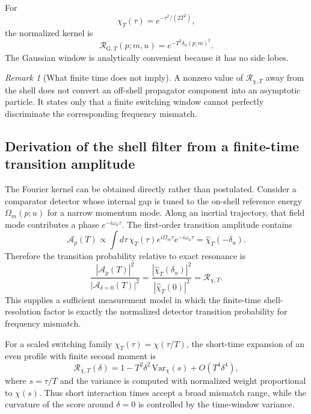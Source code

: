 \documentclass[11pt]{article}
\theoremstyle{remark}
\newtheorem{remark}{Remark}
\newcommand{\ShellRes}{\mathcal R}
\begin{document}
For
\begin{equation}
  \chi_T(\tau)=e^{-\tau^2/(2T^2)},
\end{equation}
the normalized kernel is
\begin{equation}
  \ShellRes_{\mathrm{G},T}(p;m,u)
  =e^{-T^2\delta_u(p;m)^2}.
  \label{eq:gaussian-kernel}
\end{equation}
The Gaussian window is analytically convenient because it has no side lobes.

\begin{remark}[What finite time does not imply]
A nonzero value of $\ShellRes_{\chi,T}$ away from the shell does not convert an off-shell propagator component into an asymptotic particle. It states only that a finite switching window cannot perfectly discriminate the corresponding frequency mismatch.
\end{remark}


\subsection{Derivation of the shell filter from a finite-time transition amplitude}
The Fourier kernel can be obtained directly rather than postulated. Consider a comparator detector whose internal gap is tuned to the on-shell reference energy $\Omega_m(p;u)$ for a narrow momentum mode. Along an inertial trajectory, that field mode contributes a phase $e^{-i\omega_u\tau}$. The first-order transition amplitude contains
\begin{equation}
 \mathcal A_p(T)
 \propto\int d\tau\,\chi_T(\tau)
 e^{i\Omega_m\tau}e^{-i\omega_u\tau}
 =\widehat\chi_T(-\delta_u).
 \label{eq:shell-amplitude-derivation}
\end{equation}
Therefore the transition probability relative to exact resonance is
\begin{equation}
 \frac{|\mathcal A_p(T)|^2}{|\mathcal A_{\delta=0}(T)|^2}
 =\frac{|\widehat\chi_T(\delta_u)|^2}{|\widehat\chi_T(0)|^2}
 =\ShellRes_{\chi,T}.
 \label{eq:shell-kernel-derived}
\end{equation}
This supplies a sufficient measurement model in which the finite-time shell-resolution factor is exactly the normalized detector transition probability for frequency mismatch.

For a scaled switching family $\chi_T(\tau)=\chi(\tau/T)$, the short-time expansion of an even profile with finite second moment is
\begin{equation}
 \ShellRes_{\chi,T}(\delta)
 =1-T^2\delta^2\,\mathrm{Var}_{\chi}(s)+O(T^4\delta^4),
 \label{eq:shell-short-time-filter}
\end{equation}
where $s=\tau/T$ and the variance is computed with normalized weight proportional to $\chi(s)$. Thus short interaction times accept a broad mismatch range, while the curvature of the score around $\delta=0$ is controlled by the time-window variance.
\end{document}
